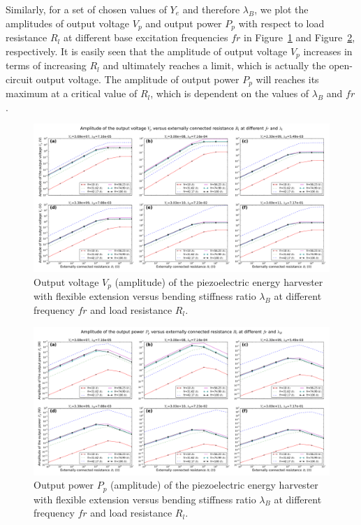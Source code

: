 \documentclass{elsarticle}
\begin{document}
Similarly, for a set of chosen values of $Y_e$ and therefore $\lambda_B$, we plot the amplitudes of output voltage $V_p$ and output power $P_p$ with respect to load resistance $R_l$ at different base excitation frequencies $fr$ in Figure~\ref{fig:fig_vol_lamB_list_vs_fr_Rl} and Figure~\ref{fig:fig_pow_lamB_list_vs_fr_Rl}, respectively. It is easily seen that the amplitude of output voltage $V_p$ increases in terms of increasing $R_l$ and ultimately reaches a limit, which is actually the open-circuit output voltage. The amplitude of output power $P_p$ will reaches its maximum at a critical value of $R_l$, which is dependent on the values of $\lambda_B$ and $fr$. 

\begin{figure}[!htbp]
    \centering
    \includegraphics[width=\textwidth]{./fig_vol_lamB_list_vs_fr_Rl}
    \caption{Output voltage $V_p$ (amplitude) of the piezoelectric energy harvester with flexible extension versus bending stiffness ratio $\lambda_B$ at different frequency $fr$ and load resistance $R_l$.  \color{red}{to be revised in the legend. change figure title} }
    \label{fig:fig_vol_lamB_list_vs_fr_Rl}
\end{figure}

\begin{figure}[!htbp]
    \centering
    \includegraphics[width=\textwidth]{./fig_pow_lamB_list_vs_fr_Rl}
    \caption{Output power $P_p$ (amplitude) of the piezoelectric energy harvester with flexible extension versus bending stiffness ratio $\lambda_B$ at different frequency $fr$ and load resistance $R_l$.  \color{red}{to be revised in the legend. change figure title} }
    \label{fig:fig_pow_lamB_list_vs_fr_Rl}
\end{figure}
\end{document}
